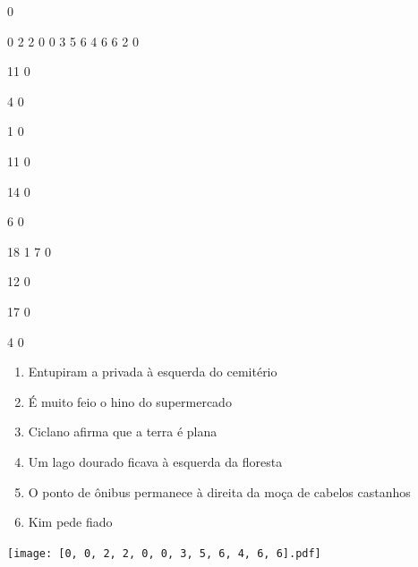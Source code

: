 \documentclass[12pt]{article}
\begin{document}
		\vfill  
		  
{
	0	%

	0	%
	2	%
	2	%
	0	%
	0	%
	3	%
	5	%
	6	%
	4	%
	6	%
	6	%
	2	%
	0	%

	11	%
	0	%

	4	%
	0	%

	1	%
	0	%

	11	%
	0	%

	14	%
	0	%

	6	%
	0	%

	18	%
	1	%
	7	%
	0	%

	12	%
	0	%

	17	%
	0	%

	4	%
	0	%

}	  
		    	

		 

\pagebreak


	\begin{enumerate}
		  \sffamily %
		  \large %


\vfill \item
Entupiram a privada	%
à esquerda
do cemitério	%

\vfill \item
É muito feio	%
o hino do supermercado	%

\vfill \item
Ciclano	%
afirma que a terra é plana	%

\vfill \item
Um lago dourado ficava	%
à esquerda
da floresta	%

\vfill \item
O ponto de ônibus permanece	%
à direita
da moça de cabelos castanhos	%

\vfill \item
Kim	%
pede fiado	%
	\end{enumerate}
		  
		  \hfill

		  \vfill

\texttt{[image: [0, 0, 2, 2, 0, 0, 3, 5, 6, 4, 6, 6].pdf]}


	\hfill	  	  

\end{document}
